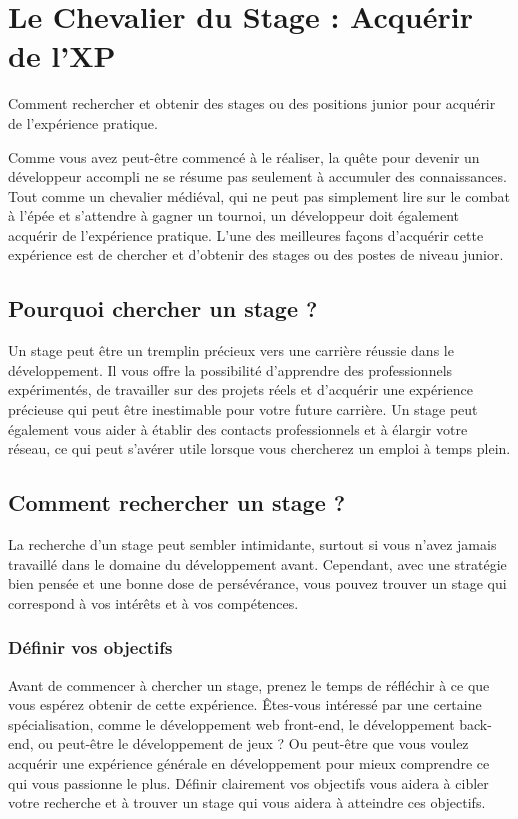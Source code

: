 \chapter{Le Chevalier du Stage : Acquérir de l'XP}

Comment rechercher et obtenir des stages ou des positions junior pour acquérir de l'expérience pratique.

Comme vous avez peut-être commencé à le réaliser, la quête pour devenir un développeur accompli ne se résume pas seulement à accumuler des connaissances. Tout comme un chevalier médiéval, qui ne peut pas simplement lire sur le combat à l'épée et s'attendre à gagner un tournoi, un développeur doit également acquérir de l'expérience pratique. L'une des meilleures façons d'acquérir cette expérience est de chercher et d'obtenir des stages ou des postes de niveau junior.

\section{Pourquoi chercher un stage ?}

Un stage peut être un tremplin précieux vers une carrière réussie dans le développement. Il vous offre la possibilité d'apprendre des professionnels expérimentés, de travailler sur des projets réels et d'acquérir une expérience précieuse qui peut être inestimable pour votre future carrière. Un stage peut également vous aider à établir des contacts professionnels et à élargir votre réseau, ce qui peut s'avérer utile lorsque vous chercherez un emploi à temps plein.

\section{Comment rechercher un stage ?}

La recherche d'un stage peut sembler intimidante, surtout si vous n'avez jamais travaillé dans le domaine du développement avant. Cependant, avec une stratégie bien pensée et une bonne dose de persévérance, vous pouvez trouver un stage qui correspond à vos intérêts et à vos compétences.

\subsection{Définir vos objectifs}

Avant de commencer à chercher un stage, prenez le temps de réfléchir à ce que vous espérez obtenir de cette expérience. Êtes-vous intéressé par une certaine spécialisation, comme le développement web front-end, le développement back-end, ou peut-être le développement de jeux ? Ou peut-être que vous voulez acquérir une expérience générale en développement pour mieux comprendre ce qui vous passionne le plus. Définir clairement vos objectifs vous aidera à cibler votre recherche et à trouver un stage qui vous aidera à atteindre ces objectifs.
